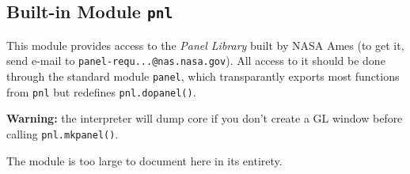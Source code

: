 \subsection{Built-in Module {\tt pnl}}

This module provides access to the
{\em Panel Library}
built by NASA Ames (to get it, send e-mail to
{\tt panel-requ...@nas.nasa.gov}).
All access to it should be done through the standard module
{\tt panel},
which transparantly exports most functions from
{\tt pnl}
but redefines
{\tt pnl.dopanel()}.

{\bf Warning:}
the {\Python} interpreter will dump core if you don't create a GL window
before calling
{\tt pnl.mkpanel()}.

The module is too large to document here in its entirety.
